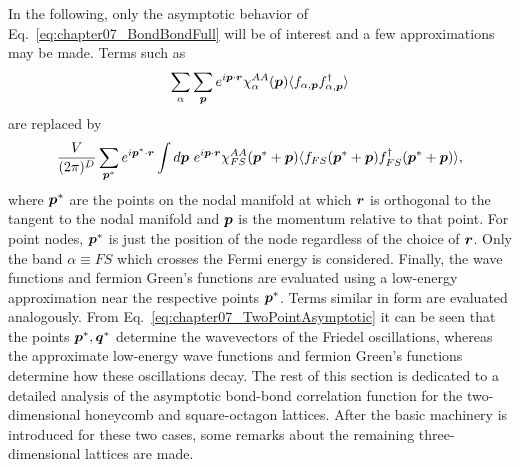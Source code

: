 %

In the following, only the asymptotic behavior of Eq.~\eqref{eq:chapter07_BondBondFull} will be of interest and a few approximations may be made.
Terms such as
%
\begin{equation}
	\sum_{\alpha} \sum_{\bm{p}} e^{i \bm{p} \cdot \bm{r}} \chi_{\alpha}^{AA}(\bm{p}) \langle f_{\alpha, \bm{p}} f^{\dagger}_{\alpha, \bm{p}} \rangle 
\end{equation}
%
are replaced by
%
\begin{equation}
	\frac{V}{(2\pi)^D} \sum_{\bm{p}^*} e^{i \bm{p}^* \cdot \bm{r}} \int d\bm{p}~e^{i \bm{p} \cdot \bm{r}} \chi_{FS}^{AA}(\bm{p}^* + \bm{p}) \langle f_{FS}(\bm{p}^* + \bm{p}) f^{\dagger}_{FS}(\bm{p}^* + \bm{p}) \rangle,
	\label{eq:chapter07_TwoPointAsymptotic}
\end{equation}
%
where $\bm{p}^*$ are the points on the nodal manifold at which $\bm{r}$ is orthogonal to the tangent to the nodal manifold and $\bm{p}$ is the momentum relative to that point.
For point nodes, $\bm{p}^*$ is just the position of the node regardless of the choice of $\bm{r}$.
Only the band $\alpha \equiv FS$ which crosses the Fermi energy is considered.
Finally, the wave functions and fermion Green's functions are evaluated using a low-energy approximation near the respective points $\bm{p}^*$.
Terms similar in form are evaluated analogously.
From Eq.~\eqref{eq:chapter07_TwoPointAsymptotic} it can be seen that the points $\bm{p}^*, \bm{q}^*$ determine the wavevectors of the Friedel oscillations, whereas the approximate low-energy wave functions and fermion Green's functions determine how these oscillations decay.
The rest of this section is dedicated to a detailed analysis of the asymptotic bond-bond correlation function for the two-dimensional honeycomb and square-octagon lattices.
After the basic machinery is introduced for these two cases, some remarks about the remaining three-dimensional lattices are made.


%
%
